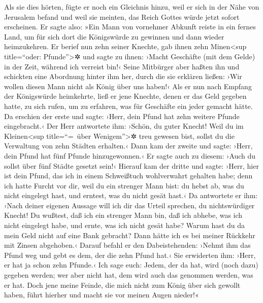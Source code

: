  Als sie dies hörten, fügte er noch ein Gleichnis hinzu,
weil er sich in der Nähe von Jerusalem befand und weil sie meinten, das
Reich Gottes würde jetzt sofort erscheinen.  Er sagte
also: »Ein Mann von vornehmer Abkunft reiste in ein fernes Land, um für
sich dort die Königswürde zu gewinnen und dann wieder heimzukehren.
 Er berief nun zehn seiner Knechte, gab ihnen zehn
Minen\textless sup title=``oder: Pfunde''\textgreater✲ und sagte zu
ihnen: ›Macht Geschäfte (mit dem Gelde) in der Zeit, während ich
verreist bin!‹  Seine Mitbürger aber haßten ihn und
schickten eine Abordnung hinter ihm her, durch die sie erklären ließen:
›Wir wollen diesen Mann nicht als König über uns haben!‹ 
Als er nun nach Empfang der Königswürde heimkehrte, ließ er jene
Knechte, denen er das Geld gegeben hatte, zu sich rufen, um zu erfahren,
was für Geschäfte ein jeder gemacht hätte.  Da erschien
der erste und sagte: ›Herr, dein Pfund hat zehn weitere Pfunde
eingebracht.‹  Der Herr antwortete ihm: ›Schön, du guter
Knecht! Weil du im Kleinen\textless sup title=``=~über
Wenigem''\textgreater✲ treu gewesen bist, sollst du die Verwaltung von
zehn Städten erhalten.‹  Dann kam der zweite und sagte:
›Herr, dein Pfund hat fünf Pfunde hinzugewonnen.‹  Er
sagte auch zu diesem: ›Auch du sollst über fünf Städte gesetzt sein!‹
 Hierauf kam der dritte und sagte: ›Herr, hier ist dein
Pfund, das ich in einem Schweißtuch wohlverwahrt gehalten habe;
 denn ich hatte Furcht vor dir, weil du ein strenger Mann
bist: du hebst ab, was du nicht eingelegt hast, und erntest, was du
nicht gesät hast.‹  Da antwortete er ihm: ›Nach deiner
eigenen Aussage will ich dir das Urteil sprechen, du nichtswürdiger
Knecht! Du wußtest, daß ich ein strenger Mann bin, daß ich abhebe, was
ich nicht eingelegt habe, und ernte, was ich nicht gesät habe?
 Warum hast du da mein Geld nicht auf eine Bank gebracht?
Dann hätte ich es bei meiner Rückkehr mit Zinsen abgehoben.‹
 Darauf befahl er den Dabeistehenden: ›Nehmt ihm das
Pfund weg und gebt es dem, der die zehn Pfund hat.‹  Sie
erwiderten ihm: ›Herr, er hat ja schon zehn Pfunde.‹  Ich
sage euch: Jedem, der da hat, wird (noch dazu) gegeben werden; wer aber
nicht hat, dem wird auch das genommen werden, was er hat.
 Doch jene meine Feinde, die mich nicht zum König über
sich gewollt haben, führt hierher und macht sie vor meinen Augen
nieder!«

